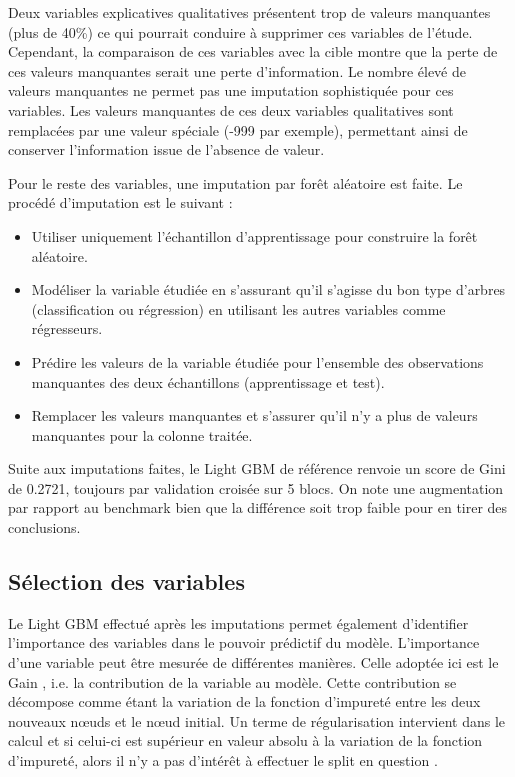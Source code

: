 \documentclass[french]{article}
\begin{document}
\begin{multicols}{2}
Deux variables explicatives  qualitatives présentent trop de valeurs manquantes (plus de 40\%) ce qui pourrait conduire à supprimer ces variables de l'étude. Cependant, la comparaison de ces variables avec la cible montre que la perte de ces valeurs manquantes serait une perte d'information. Le nombre élevé de valeurs manquantes ne permet pas une imputation sophistiquée pour ces variables. Les valeurs manquantes de ces deux variables qualitatives sont remplacées par une valeur spéciale (-999 par exemple), permettant ainsi de conserver l'information issue de l'absence de valeur.

Pour le reste des variables, une imputation par forêt aléatoire est faite. Le procédé d'imputation est le suivant :
\begin{itemize}
    \item Utiliser uniquement l'échantillon d'apprentissage pour construire la forêt aléatoire.
    \item Modéliser la variable étudiée en s'assurant qu'il s'agisse du bon type d'arbres (classification ou régression) en utilisant les autres variables comme régresseurs.
    \item Prédire les valeurs de la variable étudiée pour l'ensemble des observations manquantes des deux échantillons (apprentissage et test).
    \item Remplacer les valeurs manquantes et s'assurer qu'il n'y a plus de valeurs manquantes pour la colonne traitée.
\end{itemize}

Suite aux imputations faites, le Light GBM de référence renvoie un score de Gini de 0.2721, toujours par validation croisée sur 5 blocs. On note une augmentation par rapport au benchmark bien que la différence soit trop faible pour en tirer des conclusions.

\subsection{Sélection des variables}

Le Light GBM effectué après les imputations permet également d'identifier l'importance des variables dans le pouvoir prédictif du modèle. L'importance d'une variable peut être mesurée de différentes manières. Celle adoptée ici est le \og Gain \fg \cite{twds1}, i.e. la contribution de la variable au modèle.  Cette contribution se décompose comme étant la variation de la fonction d'impureté entre les deux nouveaux nœuds et le nœud initial. Un terme de régularisation intervient dans le calcul et si celui-ci est supérieur en valeur absolu à la variation de la fonction d'impureté, alors il n'y a pas d'intérêt à effectuer le split en question \cite{wittkowski1986classification}.



\end{multicols}
\end{document}
